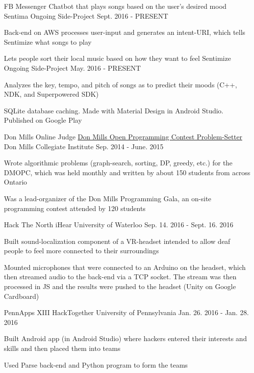 \begin{cventries}
    \cventry
    {FB Messenger Chatbot that plays songs based on the user's desired mood}
    {Sentima}
    {Ongoing Side-Project}
    {Sept. 2016 - PRESENT}
    {
      \begin{cvitems}
        \item {Back-end on AWS processes user-input and generates an intent-URI, which tells Sentimize what songs to play}
      \end{cvitems}
    }
  \cventry
    {Lets people sort their local music based on how they want to feel}
    {Sentimize}
    {Ongoing Side-Project}
    {May. 2016 - PRESENT}
    {
      \begin{cvitems}
        \item {Analyzes the key, tempo, and pitch of songs as to predict their moods (C++, NDK, and Superpowered SDK)}
        \item {SQLite database caching. Made with Material Design in Android Studio. Published on Google Play}
      \end{cvitems}
    }
  \cventry
    {Don Mills Online Judge}
    {\href{https://dmoj.ca/user/Sentient/solved}{Don Mills Open Programming Contest Problem-Setter}}
    {Don Mills Collegiate Institute}
    {Sep. 2014 - June. 2015}
    {
      \begin{cvitems}
        \item {Wrote algorithmic problems (graph-search, sorting, DP, greedy, etc.) for the DMOPC, which was held monthly and written by about 150 students from across Ontario}
        \item {Was a lead-organizer of the Don Mills Programming Gala, an on-site programming contest attended by 120 students}
      \end{cvitems}
    }
  \cventry
    {Hack The North}
    {iHear}
    {University of Waterloo}
    {Sep. 14. 2016 - Sept. 16. 2016}
    {
      \begin{cvitems}
        \item {Built sound-localization component of a VR-headset intended to allow deaf people to feel more connected to their surroundings}
        \item {Mounted microphones that were connected to an Arduino on the headset, which then streamed audio to the back-end via a TCP socket. The stream was then processed in JS and the results were pushed to the headset (Unity on Google Cardboard)}
      \end{cvitems}
    }
   \cventry
    {PennApps XIII}
    {HackTogether}
    {University of Pennsylvania}
    {Jan. 26. 2016 - Jan. 28. 2016}
    {
      \begin{cvitems}
        \item {Built Android app (in Android Studio) where hackers entered their interests and skills and then placed them into teams}
        \item {Used Parse back-end and Python program to form the teams}
      \end{cvitems}
    }
    
\end{cventries}
